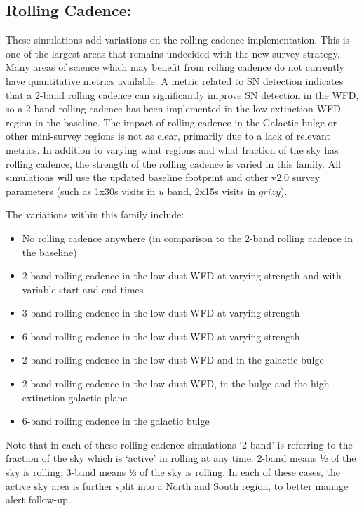\subsection{Rolling Cadence:}
These simulations add variations on the rolling cadence implementation. This is one of the largest areas that remains undecided with the new survey strategy. Many areas of science which may benefit from rolling cadence do not currently have quantitative metrics available. A metric related to SN detection indicates that a 2-band rolling cadence can significantly improve SN detection in the WFD, so a 2-band rolling cadence has been implemented in the low-extinction WFD region in the baseline. The impact of rolling cadence in the Galactic bulge or other mini-survey regions is not as clear, primarily due to a lack of relevant metrics. In addition to varying what regions and what fraction of the sky has rolling cadence, the strength of the rolling cadence is varied in this family. All simulations will use the updated baseline footprint 
and other v2.0 survey parameters (such as 1x30s visits in $u$ band, 2x15s visits in $grizy$). 

The variations within this family include:
\begin{itemize}
\item No rolling cadence anywhere (in comparison to the 2-band rolling cadence in the baseline) %
\item 2-band rolling cadence in the low-dust WFD at varying strength and with variable start and end times %
\item 3-band rolling cadence in the low-dust WFD at varying strength %
\item 6-band rolling cadence in the low-dust WFD at varying strength %
\item 2-band rolling cadence in the low-dust WFD and in the galactic bulge %
\item 2-band rolling cadence in the low-dust WFD, in the bulge and the high extinction galactic plane %
\item 6-band rolling cadence in the galactic bulge %
\end{itemize}
Note that in each of these rolling cadence simulations ‘2-band’ is referring to the fraction of the sky which is ‘active’ in rolling at any time. 2-band means ½ of the sky is rolling; 3-band means ⅓ of the sky is rolling. In each of these cases, the active sky area is further split into a North and South region, to better manage alert follow-up. 

